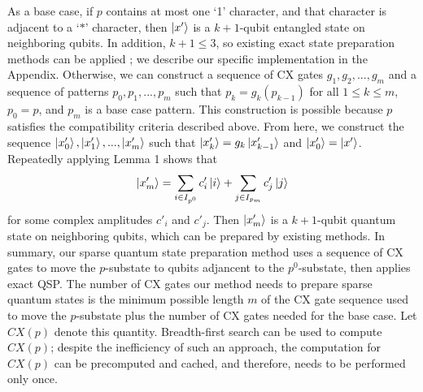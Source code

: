 As a base case, if $p$ contains at most one `1' character, and that character 
is adjacent to a `$*$' character, then $\mathinner{|{x'}\rangle}$ is a $k + 1$-qubit entangled state on neighboring qubits. In addition, $k + 1 \leq 3$, so existing exact 
state preparation methods can be applied \cite{PhysRevA.77.032320}; 
we describe our specific implementation in the Appendix. Otherwise, we can
construct a sequence of CX gates $g_1, g_2, ..., g_m$ and a sequence of
patterns $p_0, p_1, ..., p_m$ such that $p_k = g_k(p_{k - 1})$ for all 
$1 \leq k \leq m$, $p_0 = p$, and $p_m$ is a base case pattern. This
construction is possible because $p$ satisfies the compatibility criteria
described above. From here, we construct the sequence 
$\mathinner{|{x'_0}\rangle}, \mathinner{|{x'_1}\rangle}, ..., \mathinner{|{x'_m}\rangle}$ such that $\mathinner{|{x'_k}\rangle} = g_k\mathinner{|{x'_{k-1}}\rangle}$
and $\mathinner{|{x'_0}\rangle} = \mathinner{|{x'}\rangle}$.
Repeatedly applying Lemma 1 shows that
\begin{equation}
\mathinner{|{x'_m}\rangle} = \sum_{i \in {I_{p^0}}}{c_i'\mathinner{|{i}\rangle}} 
+ \sum_{j \in I_{p_m}}{c'_j\mathinner{|{j}\rangle}}
\end{equation}
for some complex amplitudes $c'_i$ and $c'_j$. Then $\mathinner{|{x'_m}\rangle}$ is a 
$k + 1$-qubit quantum state on neighboring qubits, which can be prepared by
existing methods. In summary, our sparse quantum state preparation method uses a
sequence of CX gates to move the $p$-substate to qubits adjancent to the 
$p^0$-substate, then applies exact QSP. The number of CX gates our method needs to prepare sparse quantum states is the 
minimum possible length $m$ of the CX gate sequence used to move the $p$-substate
plus the number of CX gates needed for the base case. Let $CX(p)$ denote this
quantity. Breadth-first search can be used to compute $CX(p)$; despite the
inefficiency of such an approach, the computation for $CX(p)$ can be 
precomputed
and cached, and therefore, needs to be performed only once.



